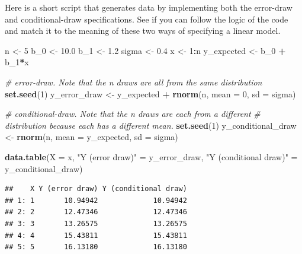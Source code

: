 \documentclass[]{book}
\newenvironment{Shaded}{\begin{snugshade}}{\end{snugshade}}
\newcommand{\CommentTok}[1]{\textcolor[rgb]{0.56,0.35,0.01}{\textit{#1}}}
\newcommand{\DataTypeTok}[1]{\textcolor[rgb]{0.13,0.29,0.53}{#1}}
\newcommand{\DecValTok}[1]{\textcolor[rgb]{0.00,0.00,0.81}{#1}}
\newcommand{\FloatTok}[1]{\textcolor[rgb]{0.00,0.00,0.81}{#1}}
\newcommand{\KeywordTok}[1]{\textcolor[rgb]{0.13,0.29,0.53}{\textbf{#1}}}
\newcommand{\NormalTok}[1]{#1}
\newcommand{\OperatorTok}[1]{\textcolor[rgb]{0.81,0.36,0.00}{\textbf{#1}}}
\newcommand{\StringTok}[1]{\textcolor[rgb]{0.31,0.60,0.02}{#1}}
\begin{document}
Here is a short script that generates data by implementing both the error-draw and conditional-draw specifications. See if you can follow the logic of the code and match it to the meaning of these two ways of specifying a linear model.

\begin{Shaded}
\begin{Highlighting}[]
\NormalTok{n <-}\StringTok{ }\DecValTok{5}
\NormalTok{b_}\DecValTok{0}\NormalTok{ <-}\StringTok{ }\FloatTok{10.0}
\NormalTok{b_}\DecValTok{1}\NormalTok{ <-}\StringTok{ }\FloatTok{1.2}
\NormalTok{sigma <-}\StringTok{ }\FloatTok{0.4}
\NormalTok{x <-}\StringTok{ }\DecValTok{1}\OperatorTok{:}\NormalTok{n}
\NormalTok{y_expected <-}\StringTok{ }\NormalTok{b_}\DecValTok{0} \OperatorTok{+}\StringTok{ }\NormalTok{b_}\DecValTok{1}\OperatorTok{*}\NormalTok{x}

\CommentTok{# error-draw. Note that the n draws are all from the same distribution}
\KeywordTok{set.seed}\NormalTok{(}\DecValTok{1}\NormalTok{)}
\NormalTok{y_error_draw <-}\StringTok{ }\NormalTok{y_expected }\OperatorTok{+}\StringTok{ }\KeywordTok{rnorm}\NormalTok{(n, }\DataTypeTok{mean =} \DecValTok{0}\NormalTok{, }\DataTypeTok{sd =}\NormalTok{ sigma)}

\CommentTok{# conditional-draw. Note that the n draws are each from a different}
\CommentTok{# distribution because each has a different mean.}
\KeywordTok{set.seed}\NormalTok{(}\DecValTok{1}\NormalTok{)}
\NormalTok{y_conditional_draw <-}\StringTok{ }\KeywordTok{rnorm}\NormalTok{(n, }\DataTypeTok{mean =}\NormalTok{ y_expected, }\DataTypeTok{sd =}\NormalTok{ sigma)}

\KeywordTok{data.table}\NormalTok{(}\DataTypeTok{X =}\NormalTok{ x,}
           \StringTok{"Y (error draw)"}\NormalTok{ =}\StringTok{ }\NormalTok{y_error_draw,}
           \StringTok{"Y (conditional draw)"}\NormalTok{ =}\StringTok{ }\NormalTok{y_conditional_draw)}
\end{Highlighting}
\end{Shaded}

\begin{verbatim}
##    X Y (error draw) Y (conditional draw)
## 1: 1       10.94942             10.94942
## 2: 2       12.47346             12.47346
## 3: 3       13.26575             13.26575
## 4: 4       15.43811             15.43811
## 5: 5       16.13180             16.13180
\end{verbatim}
\end{document}
